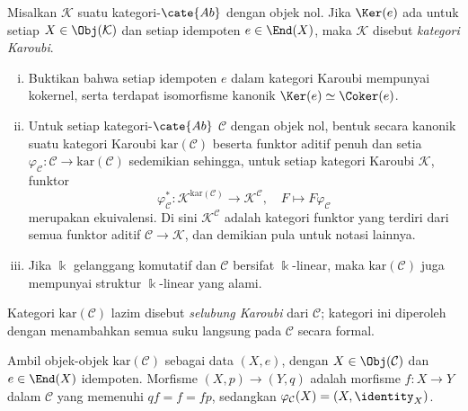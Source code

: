 \begin{Exercises}
	\item Misalkan $\mathcal{K}$ suatu kategori-$\cate{Ab}$ dengan objek nol.
	Jika $\Ker(e)$ ada untuk setiap $X\in\Obj(\mathcal{K})$ dan setiap
	idempoten $e\in\End(X)$, maka $\mathcal{K}$ disebut
	\emph{kategori Karoubi}.
	\begin{enumerate}[(i)]
		\item Buktikan bahwa setiap idempoten $e$ dalam kategori Karoubi
		mempunyai kokernel, serta terdapat isomorfisme kanonik
		$\Ker(e)\simeq\Coker(e)$.
		\item Untuk setiap kategori-$\cate{Ab}$ $\mathcal{C}$ dengan objek nol,
		bentuk secara kanonik suatu kategori Karoubi $\mathrm{kar}(\mathcal{C})$
		beserta funktor aditif penuh dan setia
		$\varphi_{\mathcal{C}}:\mathcal{C}\to\mathrm{kar}(\mathcal{C})$
		sedemikian sehingga, untuk setiap kategori Karoubi $\mathcal{K}$, funktor
		\[ \varphi_{\mathcal{C}}^*:
		\mathcal{K}^{\mathrm{kar}(\mathcal{C})}\to
		\mathcal{K}^{\mathcal{C}},\quad F\mapsto F\varphi_{\mathcal{C}} \]
		merupakan ekuivalensi. Di sini $\mathcal{K}^{\mathcal{C}}$ adalah
		kategori funktor yang terdiri dari semua funktor aditif
		$\mathcal{C}\to\mathcal{K}$, dan demikian pula untuk notasi lainnya.
		\item Jika $\Bbbk$ gelanggang komutatif dan $\mathcal{C}$ bersifat
		$\Bbbk$-linear, maka $\mathrm{kar}(\mathcal{C})$ juga mempunyai struktur
		$\Bbbk$-linear yang alami.
	\end{enumerate}
	Kategori $\mathrm{kar}(\mathcal{C})$ lazim disebut
	\emph{selubung Karoubi} dari $\mathcal{C}$; kategori ini diperoleh dengan
	menambahkan semua suku langsung pada $\mathcal{C}$ secara formal.

	\begin{hint}
		Ambil objek-objek $\mathrm{kar}(\mathcal{C})$ sebagai data $(X,e)$,
		dengan $X\in\Obj(\mathcal{C})$ dan $e\in\End(X)$ idempoten. Morfisme
		$(X,p)\to(Y,q)$ adalah morfisme $f:X\to Y$ dalam $\mathcal{C}$ yang
		memenuhi $qf=f=fp$, sedangkan
		$\varphi_{\mathcal{C}}(X)=(X,\identity_X)$.
	\end{hint}


\end{Exercises}
